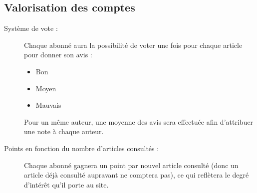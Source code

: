 \documentclass[a4paper,11pt]{article}
\begin{document}
\subsection{Valorisation des comptes}
    \begin{description}
	\item[Système de vote :] Chaque abonné aura la possibilité de voter une fois pour chaque article pour donner son avis :
	\begin{itemize}
	 \item Bon
	\item Moyen
	\item Mauvais
	\end{itemize}

    Pour un même auteur, une moyenne des avis sera effectuée afin d'attribuer une note à chaque auteur.

	\item [Points en fonction du nombre d'articles consultés :] Chaque abonné gagnera un point par nouvel article consulté (donc un article déjà consulté aupravant ne comptera pas), ce qui reflètera le degré d'intérêt qu'il porte au site.
    \end{description}



\end{document}
